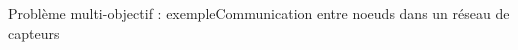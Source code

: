 \documentclass[compress]{beamer}
\theoremstyle{theorem}%
\begin{document}
\begin{frame}{Problème multi-objectif : exemple}{Communication entre noeuds dans un réseau de capteurs}
  \begin{center}
  \end{center}
\end{frame}
\end{document}
